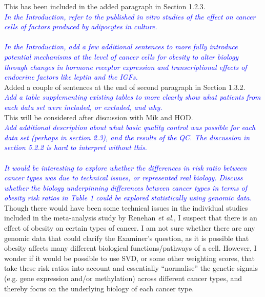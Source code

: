 \documentclass[a4paper, 12pt]{article}
\begin{document}
\noindent
This has been included in the added paragraph in Section 1.2.3.
\\

\noindent
\textcolor{blue}{
	\textit{In the Introduction, refer to the published in vitro studies of the effect on cancer cells of factors produced by adipocytes in culture.
	}
}\\

\noindent
\\

\noindent
\textcolor{blue}{
	\textit{In the Introduction, add a few additional sentences to more fully introduce potential mechanisms at the level of cancer cells for obesity to alter biology through changes in hormone receptor expression and transcriptional effects of endocrine factors like leptin and the IGFs.
	}
}\\

\noindent
Added a couple of sentences at the end of second paragraph in Section 1.3.2.
\\

\noindent
\textcolor{blue}{
	\textit{Add a table supplementing existing tables to more clearly show what patients from each data set were included, or excluded, and why.
	}
}\\

\noindent
This will be considered after discussion with Mik and HOD.
\\

\noindent
\textcolor{blue}{
	\textit{Add additional description about what basic quality control was possible for each data set (perhaps in section 2.3), and the results of the QC.
	The discussion in section 5.2.2 is hard to interpret without this.
	}
}\\

\noindent
\\

\noindent
\textcolor{blue}{
	\textit{It would be interesting to explore whether the differences in risk ratio between cancer types was due to technical issues, or represented real biology.
	Discuss whether the biology underpinning differences between cancer types in terms of obesity risk ratios in Table 1 could be explored statistically using genomic data.
	}
}\\

\noindent
Though there would have been some technical issues in the individual studies included in the meta-analysis study by Renehan \textit{et al.}, I suspect that there is an effect of obesity on certain types of cancer.
I am not sure whether there are any genomic data that could clarify the Examiner's question, as it is possible that obesity affects many different biological functions/pathways of a cell.
However, I wonder if it would be possible to use SVD, or some other weighting scores, that take these risk ratios into account and essentially ``normalise'' the genetic signals (e.g. gene expression and/or methylation) across different cancer types, and thereby focus on the underlying biology of each cancer type.
\\
\end{document}
